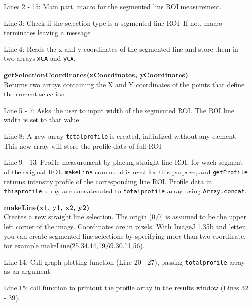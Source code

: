 \documentclass[11pt,a4paper,oneside]{report}
\newenvironment{indentCom}%
{\begin{list}{}%
         {\setlength{\leftmargin}{1em}}%
         \item[]%
}
{\end{list}}
\newcommand{\ilcom}[1]{\texttt{\small#1}}
\begin{document}
\begin{itemize}
\item Lines 2 - 16: Main part, macro for the segmented line ROI measurement.  

\item Line 3: Check if the selection type is a segmented line ROI. If not, macro
terminates leaving a message.

\item Line 4: Reads the x and y coordinates of the segmented line
and store them in two arrays \ilcom{xCA} and \ilcom{yCA}.

\begin{indentCom}
\textbf{getSelectionCoordinates(xCoordinates, yCoordinates)}\\
Returns two arrays containing the X and Y coordinates of the points that define the current selection. 
\end{indentCom}

\item Line 5 - 7: Asks the user to input width of the segmented ROI. The ROI
line width is set to that value.

\item Line 8: A new array \ilcom{totalprofile} is created, initialized without
any element. This new array will store the profile data of full ROI.

\item Line 9 - 13: Profile measurement by placing straight line ROI,
for wach segment of the original ROI. \ilcom{makeLine} command is used for this
purpose, and \ilcom{getProfile} returns intensity profile of the corresponding
line ROI. Profile data in \ilcom{thisprofile} array are concatenated to
\ilcom{totalprofile} array using \ilcom{Array.concat}.

\begin{indentCom}
\textbf{makeLine(x1, y1, x2, y2)}\\
Creates a new straight line selection. The origin (0,0) is assumed to be the upper left corner of the image. Coordinates are in pixels. With ImageJ 1.35b and letter, you can create segmented line selections by specifying more than two coordinate, for example makeLine(25,34,44,19,69,30,71,56).
\end{indentCom}

\item Line 14: Call graph plotting function (Line 20 - 27), passing
\ilcom{totalprofile} array as an argument.

\item Line 15: call function to printout the profile array in the results window
(Lines 32 - 39).


\end{itemize}
\end{document}
